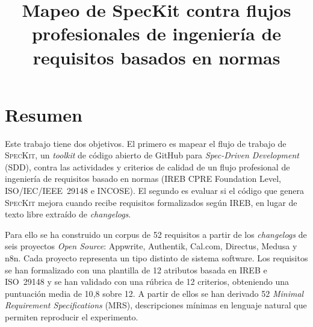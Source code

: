 \documentclass[minitoc, hidelinks, headlogo, framedcover]{tfeEPCC}
\title{Mapeo de SpecKit contra flujos profesionales de ingeniería de requisitos basados en normas}
\begin{document}
\sloppy 
\pagebreak 


\pagestyle{empty}




\chapter*{Resumen}

Este trabajo tiene dos objetivos. El primero es mapear el flujo de trabajo de \textsc{SpecKit}, un \emph{toolkit} de c\'odigo abierto de GitHub para \emph{Spec-Driven Development} (SDD), contra las actividades y criterios de calidad de un flujo profesional de ingenier\'ia de requisitos basado en normas (IREB CPRE Foundation Level, ISO/IEC/IEEE~29148 e INCOSE). El segundo es evaluar si el c\'odigo que genera \textsc{SpecKit} mejora cuando recibe requisitos formalizados seg\'un IREB, en lugar de texto libre extra\'ido de \emph{changelogs}.

Para ello se ha construido un corpus de 52 requisitos a partir de los \emph{changelogs} de seis proyectos \emph{Open Source}: Appwrite, Authentik, Cal.com, Directus, Medusa y n8n. Cada proyecto representa un tipo distinto de sistema software. Los requisitos se han formalizado con una plantilla de 12 atributos basada en IREB e ISO~29148 y se han validado con una r\'ubrica de 12 criterios, obteniendo una puntuaci\'on media de 10{,}8 sobre 12. A partir de ellos se han derivado 52 \emph{Minimal Requirement Specifications} (MRS), descripciones m\'inimas en lenguaje natural que permiten reproducir el experimento.
\end{document}

